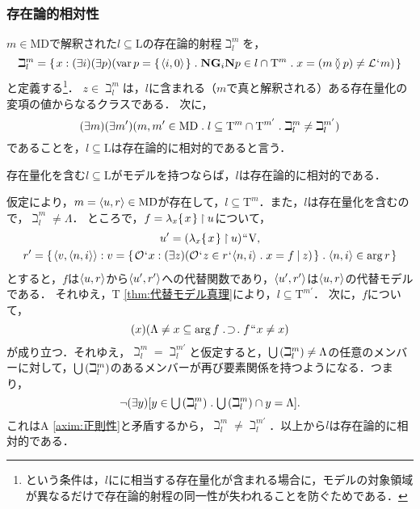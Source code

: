 \subsubsection{存在論的相対性}
\label{sssec:存在論的相対性}

$m\in\mathrm{MD}$で解釈された$l\subseteq\mathrm{L}$の存在論的射程$\beth^m_l$を，
\[
    \beth^m_l = \classab{x:(\exists i)(\exists p)(\mathrm{var}\,p = \classab{\orp{i,0}}\con{1}\mathbf{N}\mathbf{G}_i\mathbf{N}p\in l\cap\mathrm{T}^{m}\con{1}x = (m\exten p)\neq \mathcal{L}\fap m)}
\]
と定義する\footnote{
    という条件は，$l$にに相当する存在量化が含まれる場合に，モデルの対象領域が異なるだけで存在論的射程の同一性が失われることを防ぐためである．
}．
$z\in\beth^m_l$は，$l$に含まれる（$m$で真と解釈される）ある存在量化の変項の値からなるクラスである．
次に，
\[
    (\exists m)(\exists m')(m,m'\in\mathrm{MD}\con{1}l\subseteq\mathrm{T}^{m}\cap \mathrm{T}^{m'}\con{1}\beth^m_l\neq \beth^{m'}_l)
\]
であることを，$l\subseteq\mathrm{L}$は存在論的に相対的であると言う．

\begin{thm}
\label{thm:存在論的相対性}
存在量化を含む$l\subseteq\mathrm{L}$がモデルを持つならば，$l$は存在論的に相対的である．
\begin{pfx}
仮定により，$m=\langle u,r \rangle\in\mathrm{MD}$が存在して，$l\subseteq \mathrm{T}^{m}$．また，$l$は存在量化を含むので，$\beth^m_l\neq \Lambda$．
ところで，$f = \lambda_x\{\mspace{2mu}x\mspace{2mu}\}\mathbin{\upharpoonright} u$について，
\begin{gather*}
    u' = (\lambda_x\classab{x}\uphr u)\img\univ,\\
    r' = \classab{\orp{v,\orp{n,i}}:
        v = \classab{\mathcal{O}\fap x:
            (\exists z)(
                \mathcal{O}\fap z\in r\fap \orp{n,i}\con{1}x = f\resl z
            )
        }\con{1}\orp{n,i}\in\arg r
    }
\end{gather*}
とすると，$f$は$\langle u,r \rangle$から$\langle u',r' \rangle$への代替関数であり，$\langle u',r' \rangle$は$\langle u,r \rangle$の代替モデルである．
それゆえ，T \ref{thm:代替モデル真理}により，$l\subseteq \mathrm{T}^{m'}$．
次に，$f$について，
\[
    (x)(\Lambda\neq x\subseteq \arg f\case{1}{1}{1}f\img x \neq x)
\]
が成り立つ．それゆえ，$\beth^{m}_l = \beth^{m'}_l$と仮定すると，${\textstyle\bigcup}\mspace{3mu}(\beth^{m}_l)\neq\Lambda$の任意のメンバーに対して，${\textstyle\bigcup}\mspace{3mu}(\beth^{m}_l)$のあるメンバーが再び要素関係を持つようになる．つまり，
\[
    \neg(\exists y)[y\in \union{(\beth^{m}_l)}\con{1}\union{(\beth^{m}_l)}\cap y =\Lambda].
\]
これはA \ref{axim:正則性}と矛盾するから，$\beth^{m}_l\neq \beth^{m'}_l$．以上から$l$は存在論的に相対的である．
\end{pfx}
\end{thm}

